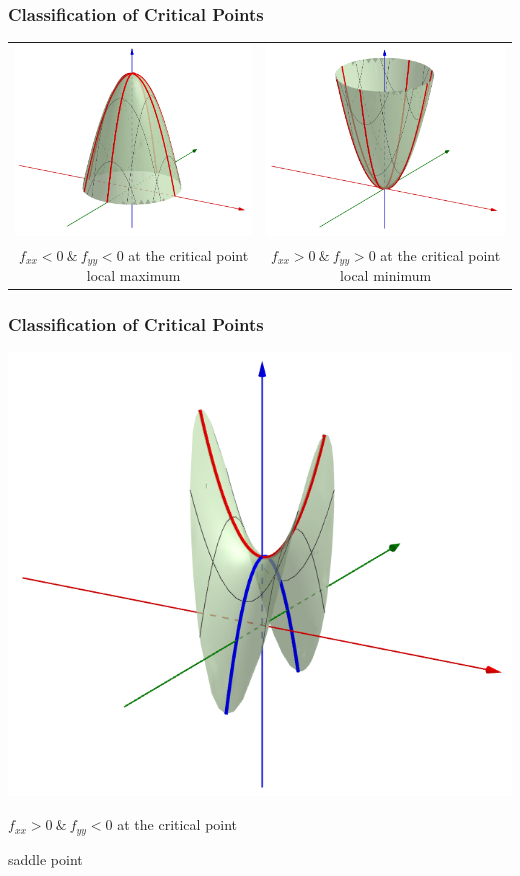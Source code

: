 \documentclass[10pt]{beamer}
\begin{document}
\begin{frame}
\frametitle{Classification of Critical Points}
\centering
\begin{tabular}{cc}
\includegraphics[width=.45\textwidth]{max3.png}&\includegraphics[width=.45\textwidth]{min3.png}\\[6pt]
\parbox{.45\textwidth}{\centering $f_{xx} < 0\ \&\ f_{yy} < 0$\\at the critical point\\local maximum} &\parbox{.45\textwidth}{\centering $f_{xx}>0\ \&\ f_{yy}>0$\\at the critical point\\local minimum}
\end{tabular}

\end{frame}

\begin{frame}
\frametitle{Classification of Critical Points}
\centering
\includegraphics[width=.7\textwidth]{saddle3.png}

$f_{xx} >0\ \&\ f_{yy} < 0$ at the critical point

saddle point

\end{frame}
\end{document}
